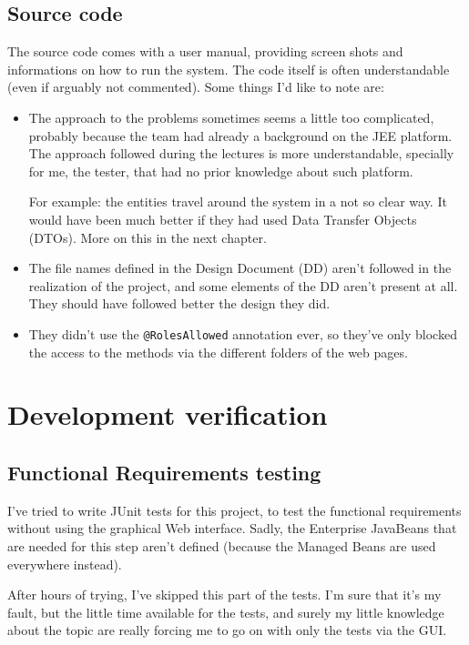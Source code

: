\documentclass[a4paper,12pt]{book}
\begin{document}
\section{Source code}
The source code comes with a user manual, providing screen shots and informations on how to run the system. The code itself is often understandable (even if arguably not commented). Some things I'd like to note are:
\begin{itemize}
  \item The approach to the problems sometimes seems a little too complicated, probably because the team had already a background on the JEE platform. The approach followed during the lectures is more understandable, specially for me, the tester, that had no prior knowledge about such platform.
  
  For example: the entities travel around the system in a not so clear way. It would have been much better if they had used Data Transfer Objects (DTOs). More on this in the next chapter.
  \item The file names defined in the Design Document (DD) aren't followed in the realization of the project, and some elements of the DD aren't present at all. They should have followed better the design they did.
  \item They didn't use the \texttt{@RolesAllowed} annotation ever, so they've only blocked the access to the methods via the different folders of the web pages.
\end{itemize}

\chapter{Development verification}

\section{Functional Requirements testing}
I've tried to write JUnit tests for this project, to test the functional requirements without using the graphical Web interface. Sadly, the Enterprise JavaBeans that are needed for this step aren't defined (because the Managed Beans are used everywhere instead).

After hours of trying, I've skipped this part of the tests. I'm sure that it's my fault, but the little time available for the tests, and surely my little knowledge about the topic are really forcing me to go on with only the tests via the GUI.
\end{document}
